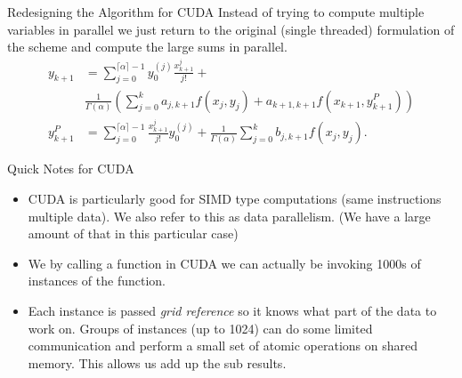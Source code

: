 \documentclass[pdf]{beamer}
\begin{document}
\begin{frame}{Redesigning the Algorithm for CUDA}
    Instead of trying to compute multiple variables in parallel we just return to the original (single threaded) formulation of the scheme and compute the large sums in parallel. 
        \begin{align*}
    y_{k+1} &= \sum_{j=0}^{\lceil \alpha \rceil - 1} y_{0}^{(j)} \frac{x^j_{k+1}}{j!} + \\
    & \frac{1}{\Gamma(\alpha)} \left( \sum_{j=0}^k a_{j,k+1} f(x_j,y_j) + a_{k+1,k+1}f(x_{k+1}, y_{k+1}^P )\right) \\
    y_{k+1}^P &= \sum_{j=0}^{\lceil \alpha \rceil - 1} \frac{x^{j}_{k+1}}{j!} y_{0}^{(j)} + \frac{1}{\Gamma(\alpha)} \sum_{j=0}^{k} b_{j,k+1} f(x_j, y_j).
\end{align*}
\end{frame}


\begin{frame}{Quick Notes for CUDA}
\begin{itemize}
    \item CUDA is particularly good for SIMD type computations (same instructions multiple data). We also refer to this as data parallelism. (We have a large amount of that in this particular case)
    \item We by calling a function in CUDA we can actually be invoking 1000s of instances of the function. 
    \item Each instance is passed \emph{grid reference} so it knows what part of the data to work on. Groups of instances (up to 1024) can do some limited communication and perform a small set of atomic operations on shared memory. This allows us add up the sub results.
\end{itemize}
\end{frame}
\end{document}
